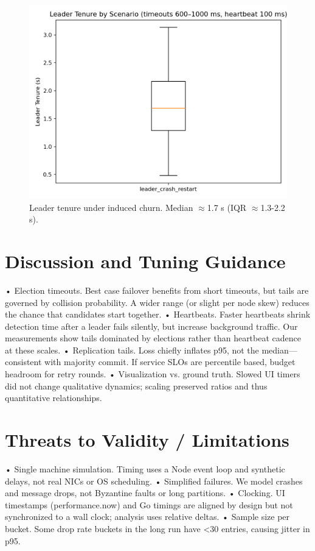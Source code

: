 \documentclass[11pt]{article}
\begin{document}
\begin{figure}[t]
  \centering
  \includegraphics[width=\columnwidth]{figures/leader_tenure_box.png}
  \caption{Leader tenure under induced churn. Median $\approx$1.7 s (IQR $\approx$1.3-2.2 s).}
  \label{fig:tenure}
\end{figure}

\section{Discussion and Tuning Guidance}
•	Election timeouts. Best case failover benefits from short timeouts, but tails are governed by collision probability. A wider range (or slight per node skew) reduces the chance that candidates start together.
•	Heartbeats. Faster heartbeats shrink detection time after a leader fails silently, but increase background traffic. Our measurements show tails dominated by elections rather than heartbeat cadence at these scales.
•	Replication tails. Loss chiefly inflates p95, not the median—consistent with majority commit. If service SLOs are percentile based, budget headroom for retry rounds.
•	Visualization vs. ground truth. Slowed UI timers did not change qualitative dynamics; scaling preserved ratios and thus quantitative relationships.

\section{Threats to Validity / Limitations}
•	Single machine simulation. Timing uses a Node event loop and synthetic delays, not real NICs or OS scheduling.
•	Simplified failures. We model crashes and message drops, not Byzantine faults or long partitions.
•	Clocking. UI timestamps (performance.now) and Go timings are aligned by design but not synchronized to a wall clock; analysis uses relative deltas.
•	Sample size per bucket. Some drop rate buckets in the long run have <30 entries, causing jitter in p95.
\end{document}
